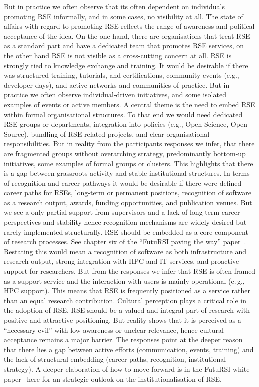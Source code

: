 \documentclass{eceasst}
\newcommand{\eg}{e.\,g.}
\begin{document}
But in practice we often observe that its often dependent on individuals promoting RSE informally, and in some cases, no visibility at all.
The state of affairs with regard to promoting RSE reflects the range of awareness and political acceptance of the idea. On the one hand,
there are organisations that treat RSE as a standard part and have a dedicated team that promotes RSE services, on the other hand RSE is not visible as
a cross-cutting concern at all.
RSE is strongly tied to knowledge exchange and training.
It would be desirable if there was structured training, tutorials, and certifications, community events (e.g., developer days), and active networks and communities of practice.
But in practice we often observe individual-driven initiatives, and some isolated examples of events or active members.
A central theme is the need to embed RSE within formal organisational structures.
To that end we would need dedicated RSE groups or departments, integration into policies (e.g., Open Science, Open Source), bundling of RSE-related projects, and clear organisational responsibilities.
But in reality from the participants responses we infer, that there
are fragmented groups without overarching strategy,
predominantly bottom-up initiatives,
some examples of formal groups or clusters.
This highlights that there is a gap between grassroots activity and stable institutional structures.
In terms of recognition and career pathways it would be desirable if there were 
defined career paths for RSEs,
long-term or permanent positions,
recognition of software as a research output,
awards, funding opportunities, and publication venues.
But we see a only partial support from supervisors and a lack of long-term career perspectives and stability hence recognition mechanisms are widely desired but rarely implemented structurally.
RSE should be embedded as a core component of research processes. See chapter six of the \enquote{FutuRSI paving the way} paper \cite{mannseicher_2025_17672125}.
Restating this would mean a
recognition of software as both infrastructure and research output,
strong integration with HPC and IT services,
and proactive support for researchers.
But from the responses we infer that
RSE is often framed as a support service
and the interaction with users is mainly operational (\eg, HPC support).
This means that RSE is frequently positioned as a service rather than an equal research contribution.
Cultural perception plays a critical role in the adoption of RSE\@.
RSE should be a  valued and integral part of research with positive and attractive positioning.
But reality shows that it is perceived as a “necessary evil” with low awareness or unclear relevance, hence cultural acceptance remains a major barrier.
The responses point at the deeper reason that there lies a gap between active efforts (communication, events, training) and the lack of structural embedding (career paths, recognition, institutional strategy).
A deeper elaboration of how to move forward is in the FutuRSI white paper \cite{Mannseicher:2025a} here for an strategic outlook on the institutionalisation of RSE.
\end{document}
